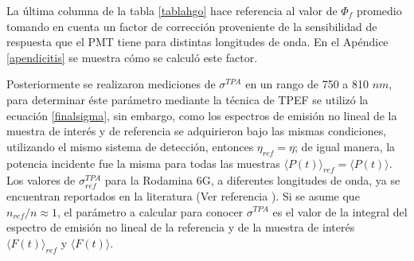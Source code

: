 La \'ultima columna de la tabla \ref{tablahgo} hace referencia al valor de $\Phi_f$ promedio tomando en cuenta un factor de correcci\'on proveniente de la sensibilidad de respuesta que el PMT tiene para distintas longitudes de onda. En el Ap\'endice \ref{apendicitis} se muestra c\'omo se calcul\'o este factor.

\begin{table}[h]
\centering
{} 
\caption{ Valores obtenidos de eficiencia cu\'antica de fluorescencia $\Phi_f$ de las soluciones 3, 6, 7, 10 y 13 y las suspensiones 3 y 7.\label{tablahgo}}
\end{table}

Posteriormente se realizaron mediciones de $\sigma^{TPA}$ en un rango de 750 a 810 $nm$, para determinar \'este par\'ametro mediante la t\'ecnica de TPEF se utiliz\'o la ecuaci\'on \ref{finalsigma}, sin embargo, como los espectros de emisi\'on no lineal de la muestra de inter\'es y de referencia se adquirieron bajo las mismas condiciones, utilizando el mismo sistema de detecci\'on, entonces $\eta_{ref}=\eta$; de igual manera, la potencia incidente fue la misma para todas las muestras $\langle P(t)\rangle_{ref}=\langle P(t)\rangle$. Los valores de $\sigma^{TPA}_{ref}$ para la Rodamina 6G, a diferentes longitudes de onda, ya se encuentran reportados en la literatura (Ver referencia \cite{rusitos}). Si se asume que $n_{ref}/n\approx 1$, el par\'ametro a calcular para conocer $\sigma^{TPA}$ es el valor de la integral del espectro de emisi\'on no lineal de la referencia y de la muestra de inter\'es $\langle F(t)\rangle_{ref}$ y $\langle F(t)\rangle$.

